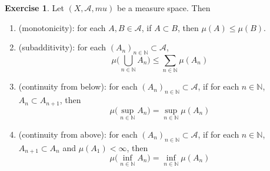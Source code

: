 \documentclass[12pt]{amsart}
\theoremstyle{definition}
\newtheorem{ex}[definition]{Exercise}
\newcommand{\N}{\mathbb{N}}
\newcommand{\MA}{\mathcal{A}}
\newcommand{\lex}[1]{\label{ex:#1}}
\begin{document}
	\begin{ex} \lex{00000} 
		Let $(X, \MA, mu)$ be a measure space. Then 
		\begin{enumerate}
			\item (monotonicity): for each $A,B \in \MA$, if $A \subset B$, then $\mu(A) \leq \mu(B)$.
			\item (subadditivity): for each $(A_n)_{n \in \N} \subset \MA$, $$\mu \bigg( \bigcup_{n \in \N} A_n \bigg) \leq \sum_{n \in \N}\mu(A_n)$$
			\item (continuity from below): for each $(A_n)_{n \in \N} \subset \MA$, if for each $n \in \N$, $A_n \subset A_{n+1}$, then $$\mu\bigg(\sup_{n \in \N} A_n\bigg) = \sup_{n \in \N}\mu(A_n)$$
			\item (continuity from above): for each $(A_n)_{n \in \N} \subset \MA$, if for each $n \in \N$, $ A_{n+1} \subset A_n$ and $\mu(A_1) < \infty$, then $$\mu\bigg(\inf_{n \in \N} A_n\bigg) = \inf_{n \in \N}\mu(A_n)$$
		\end{enumerate}
		
	\end{ex}
	
\end{document}
